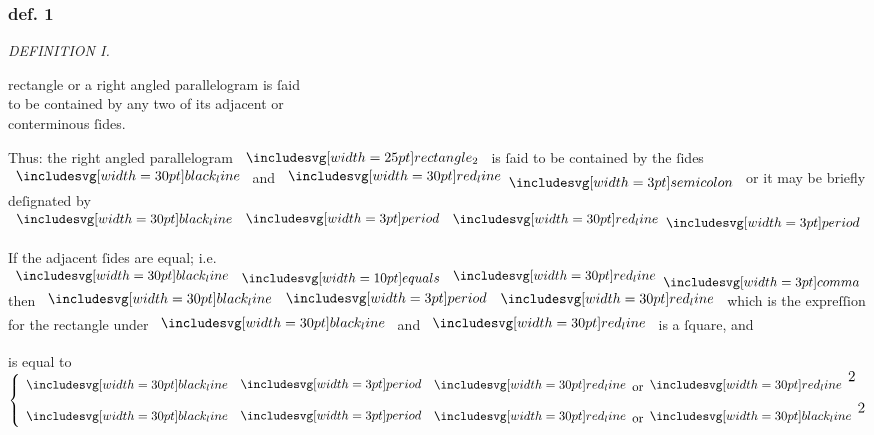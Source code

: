 \documentclass[12pt,preview]{standalone}
\begin{document}
\subsubsection{def. 1}

\begin{minipage}[t]{0.33\textwidth}
    \vspace{30pt}
    
\end{minipage}%
\hfill
\begin{minipage}[t]{0.64\textwidth}
    \vspace{0pt}

    \begin{center}
        \textit{DEFINITION I.}\label{book2def1} \\
    \end{center}

    \hfill

    \begin{center}
        \raggedright \lettrine[lines=4, loversize=1, nindent=0pt]{}{} rectangle or a right angled parallelogram is ſaid\\ to be contained by any two of its adjacent or\\ conterminous ſides.
    \end{center}

    \hfill

    \hfill

    \begin{center}
        Thus: the right angled parallelogram $\img{rectangle_2}$  is ſaid to be contained by the ſides $\blackline$ and $\redline \bsemicolon$ or it may be briefly deſignated by $\blackline \bmultiply \redline \bperiod$
    \end{center}

    \hfill

    \begin{center}
        If the adjacent ſides are equal; i.e. $\blackline \bequals \redline \bcomma$ then $\blackline \bmultiply \redline$ which is the expreſſion for the rectangle under $\blackline$ and $\redline$ is a ſquare, and
    \end{center}

    \hfill

    \begin{center}
        is equal to $\left\{\begin{aligned}\blackline & \bmultiply \redline \text{or} \redline^{\text{\large 2}} \\ \blackline & \bmultiply \redline \text{or} \blackline^{\text{\large 2}} \end{aligned}\right.$
    \end{center}
\end{minipage}%
\end{document}
